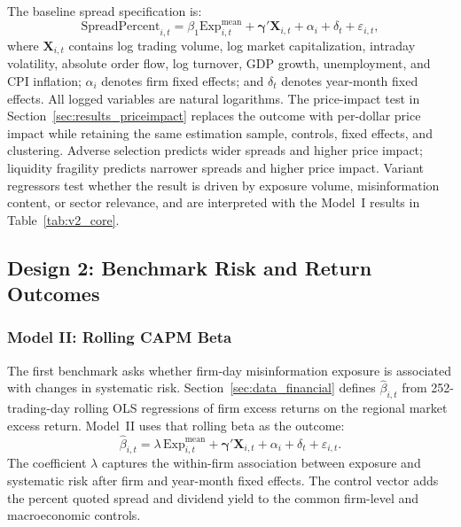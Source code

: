 \documentclass{article}
\theoremstyle{plain}
\begin{document}
The baseline spread specification is:
\begin{equation}
\text{SpreadPercent}_{i,t} = \beta_1 \mathrm{Exp}^{\text{mean}}_{i,t} + \boldsymbol{\gamma}' \mathbf{X}_{i,t} + \alpha_i + \delta_t + \varepsilon_{i,t},
\label{eq:spread_reg}
\end{equation}
where $\mathbf{X}_{i,t}$ contains log trading volume, log market capitalization, intraday volatility, absolute order flow, log turnover, GDP growth, unemployment, and CPI inflation; $\alpha_i$ denotes firm fixed effects; and $\delta_t$ denotes year-month fixed effects. All logged variables are natural logarithms. The price-impact test in Section~\ref{sec:results_priceimpact} replaces the outcome with per-dollar price impact while retaining the same estimation sample, controls, fixed effects, and clustering. Adverse selection predicts wider spreads and higher price impact; liquidity fragility predicts narrower spreads and higher price impact. Variant regressors test whether the result is driven by exposure volume, misinformation content, or sector relevance, and are interpreted with the Model~I results in Table~\ref{tab:v2_core}.

\subsection{Design 2: Benchmark Risk and Return Outcomes}

\subsubsection{Model II: Rolling CAPM Beta}

The first benchmark asks whether firm-day misinformation exposure is associated with changes in systematic risk. Section~\ref{sec:data_financial} defines $\hat{\beta}_{i,t}$ from 252-trading-day rolling OLS regressions of firm excess returns on the regional market excess return. Model~II uses that rolling beta as the outcome:
\begin{equation}
\hat{\beta}_{i,t} = \lambda\,\mathrm{Exp}^{\text{mean}}_{i,t} + \boldsymbol{\gamma}' \mathbf{X}_{i,t} + \alpha_i + \delta_t + \varepsilon_{i,t}.
\label{eq:beta_misinfo}
\end{equation}
The coefficient $\lambda$ captures the within-firm association between exposure and systematic risk after firm and year-month fixed effects. The control vector adds the percent quoted spread and dividend yield to the common firm-level and macroeconomic controls.
\end{document}
